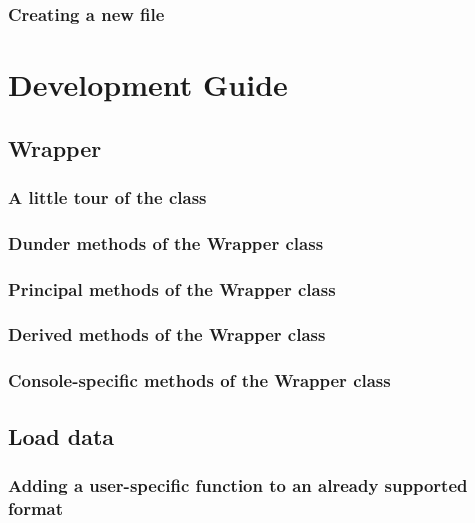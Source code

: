 \documentclass{book}
\newcommand{\mypart}[1]{\setcounter{chapter}{0} \part{#1}}
\begin{document}
        \section{Creating a new file}
            



\mypart{Development Guide} \label{chapter:dev_guide}
    \chapter{Wrapper}\label{sec:wrapper}
        \section{A little tour of the class}
            
        
        \section{Dunder methods of the Wrapper class}
            

        \section{Principal methods of the Wrapper class}
            

        \section{Derived methods of the Wrapper class}
            

        \section{Console-specific methods of the Wrapper class}
            

    
    \chapter{Load data} \label{chap:load_data}
        
        \section{Adding a user-specific function to an already supported format} \label{subsec:load_data.user_specific}
            
\end{document}
